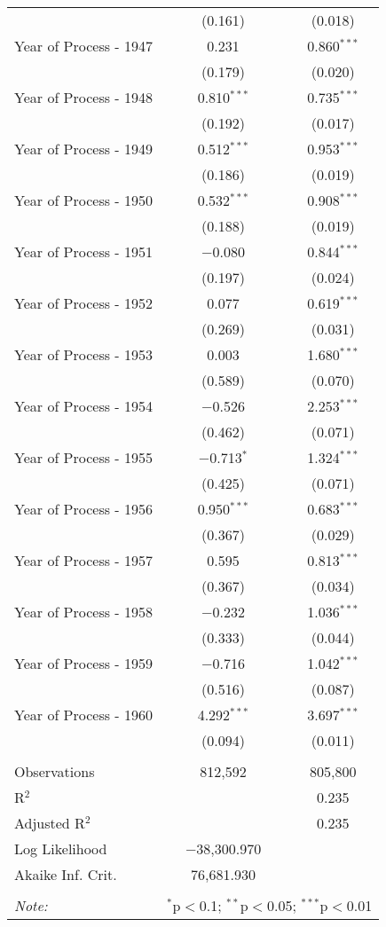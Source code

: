 \begin{table}[!h]
\begin{tabular}{@{\extracolsep{5pt}}lcc}
  & (0.161) & (0.018) \\ 
  Year of Process - 1947 & 0.231 & 0.860$^{***}$ \\ 
  & (0.179) & (0.020) \\ 
  Year of Process - 1948 & 0.810$^{***}$ & 0.735$^{***}$ \\ 
  & (0.192) & (0.017) \\ 
  Year of Process - 1949 & 0.512$^{***}$ & 0.953$^{***}$ \\ 
  & (0.186) & (0.019) \\ 
  Year of Process - 1950 & 0.532$^{***}$ & 0.908$^{***}$ \\ 
  & (0.188) & (0.019) \\ 
  Year of Process - 1951 & $-$0.080 & 0.844$^{***}$ \\ 
  & (0.197) & (0.024) \\ 
  Year of Process - 1952 & 0.077 & 0.619$^{***}$ \\ 
  & (0.269) & (0.031) \\ 
  Year of Process - 1953 & 0.003 & 1.680$^{***}$ \\ 
  & (0.589) & (0.070) \\ 
  Year of Process - 1954 & $-$0.526 & 2.253$^{***}$ \\ 
  & (0.462) & (0.071) \\ 
  Year of Process - 1955 & $-$0.713$^{*}$ & 1.324$^{***}$ \\ 
  & (0.425) & (0.071) \\ 
  Year of Process - 1956 & 0.950$^{***}$ & 0.683$^{***}$ \\ 
  & (0.367) & (0.029) \\ 
  Year of Process - 1957 & 0.595 & 0.813$^{***}$ \\ 
  & (0.367) & (0.034) \\ 
  Year of Process - 1958 & $-$0.232 & 1.036$^{***}$ \\ 
  & (0.333) & (0.044) \\ 
  Year of Process - 1959 & $-$0.716 & 1.042$^{***}$ \\ 
  & (0.516) & (0.087) \\ 
  Year of Process - 1960 & 4.292$^{***}$ & 3.697$^{***}$ \\ 
  & (0.094) & (0.011) \\ 
 \hline \\[-1.8ex] 
Observations & 812,592 & 805,800 \\ 
R$^{2}$ &  & 0.235 \\ 
Adjusted R$^{2}$ &  & 0.235 \\ 
Log Likelihood & $-$38,300.970 &  \\ 
Akaike Inf. Crit. & 76,681.930 &  \\ 
\hline 
\hline \\[-1.8ex] 
\textit{Note:}  & \multicolumn{2}{r}{$^{*}$p$<$0.1; $^{**}$p$<$0.05; $^{***}$p$<$0.01} \\ 
\end{tabular} 
\end{table} 
